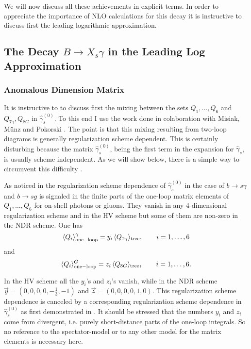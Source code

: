 We will now discuss all these achievements in explicit terms.
In order to appreciate the importance of NLO calculations for this
decay it is instructive to discuss first the leading logarithmic
approximation.
\subsection{The Decay $B\to X_s\gamma$ in the Leading Log Approximation}
         \label{sec:Heff:Bsgamma:lo}
\subsubsection{Anomalous Dimension Matrix}
It is instructive to to discuss first the mixing between 
the sets $Q_1,\ldots,Q_6$ and $Q_{7\gamma},Q_{8G}$ in $\hat\gamma_s^{(0)}$.
To this end I use the work done in colaboration with Misiak, M\"unz
and Pokorski \cite{BMMP:94}.
The point is that this mixing resulting from two-loop
diagrams is generally regularization scheme dependent. This is
certainly disturbing because the matrix $\hat\gamma_s^{(0)}$, being the
first term in the expansion for $\hat\gamma_s$, is usually scheme
independent.  As we will show below, there is a simple way to circumvent 
this difficulty \cite{BMMP:94}.

As noticed in \cite{CFMRS:93,CFRS:94} the regularization scheme
dependence of $\hat\gamma_s^{(0)}$ in the case of $b\to s\gamma$ and
$b\to s g$ is signaled in the finite parts of the one-loop matrix 
elements of $Q_1,\ldots,Q_6$
for on-shell photons or gluons.  They vanish in any 4-dimensional
regularization scheme and in the HV scheme but some of them are
non-zero in the NDR scheme.  One has
\begin{equation}
\langle Q_i \rangle_{\rm one-loop}^\gamma =
y_i \, \langle Q_{7\gamma} \rangle_{\rm tree},
\qquad i=1,\ldots,6
\label{eq:defy}
\end{equation}
and
\begin{equation}
\langle Q_i\rangle_{\rm one-loop}^G =
z_i \, \langle Q_{8G} \rangle_{\rm tree},
\qquad i=1,\ldots,6.
\end{equation}

In the HV scheme all the $y_i$'s and $z_i$'s vanish, while in the NDR
scheme $\vec{y} = (0,0,0,0,-\frac{1}{3},-1)$ and $\vec{z} =
(0,0,0,0,1,0)$.  This regularization scheme dependence is canceled by a
corresponding regularization scheme dependence in $\hat\gamma_s^{(0)}$
as first demonstrated in \cite{CFMRS:93,CFRS:94}. It should be
stressed that the numbers $y_i$ and $z_i$ come from divergent, i.e.
purely short-distance parts of the one-loop integrals. So no reference
to the spectator-model or to any other model for the matrix elements is
necessary here.

